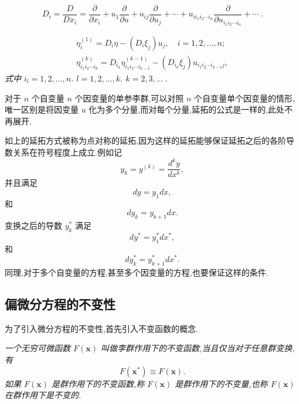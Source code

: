 \begin{definition}[全导数算子]
\emph{\begin{equation*}
D_i=\frac{D}{Dx_i}=\frac{\partial}{\partial x_i}+u_1\frac{\partial}{\partial u}+u_{ij}\frac{\partial}{\partial u_j}+\cdots+u_{ii_1i_2\cdots i_n}\frac{\partial}{\partial u_{i_1i_2\cdots i_n}}+\cdots~.
\end{equation*}}
\end{definition}

\begin{theorem}
\emph{\begin{equation*}
\begin{aligned}
\eta_i^{(1)}=D_i\eta-(D_i\xi_j)u_j,\quad i=1,2,\ldots,n ;\\
\eta^{(k)}_{i_1i_2\cdots i_k} = D_{i_k}\eta_{i_1i_2\cdots i_{k-1}}^{(k-1)}-(D_{i_k}\xi_j)u_{i_1i_2\cdots i_{k-1}j},
\end{aligned}
\end{equation*}
式中 $i_l=1,2,\ldots,n$. $l=1,2,\ldots,k$. $k=2,3,\ldots~.$}
\end{theorem}

对于 $n$ 个自变量 $n$ 个因变量的单参李群,可以对照 $n$ 个自变量单个因变量的情形,唯一区别是将因变量 $u$ 化为多个分量,而对每个分量,延拓的公式是一样的,此处不再展开.

如上的延拓方式被称为点对称的延拓,因为这样的延拓能够保证延拓之后的各阶导数关系在符号程度上成立.例如记
\begin{equation*}
	y_k=y^{(k)}=\frac{d^ky}{dx^k},
\end{equation*}
并且满足
\begin{equation*}
	dy=y_1dx,
\end{equation*}
和
\begin{equation*}
	dy_k=y_{k+1}dx.
\end{equation*}
变换之后的导数 $y_k^*$ 满足
\begin{equation*}
	dy^*=y^*_1dx^*,
\end{equation*}
和
\begin{equation*}
	dy_k^*=y^*_{k+1}dx^*.
\end{equation*}
同理,对于多个自变量的方程,甚至多个因变量的方程,也要保证这样的条件.

\subsection{偏微分方程的不变性}
为了引入微分方程的不变性,首先引入不变函数的概念.
\begin{definition}[不变函数]
	\emph{一个无穷可微函数 $F(\mathbf{x})$ 叫做李群作用下的不变函数,当且仅当对于任意群变换,有
	\begin{equation*}
		F(\mathbf{x^*})\equiv F(\mathbf{x}).
	\end{equation*}
如果 $F(\mathbf{x})$ 是群作用下的不变函数,称 $F(\mathbf{x})$ 是群作用下的不变量,也称 $F(\mathbf{x})$ 在群作用下是不变的.}
\end{definition}

